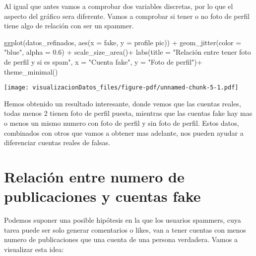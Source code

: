 \documentclass[
  letterpaper,
  DIV=11,
  numbers=noendperiod]{scrreprt}
\newenvironment{Shaded}{\begin{snugshade}}{\end{snugshade}}
\newcommand{\AttributeTok}[1]{\textcolor[rgb]{0.40,0.45,0.13}{#1}}
\newcommand{\FloatTok}[1]{\textcolor[rgb]{0.68,0.00,0.00}{#1}}
\newcommand{\FunctionTok}[1]{\textcolor[rgb]{0.28,0.35,0.67}{#1}}
\newcommand{\NormalTok}[1]{\textcolor[rgb]{0.00,0.23,0.31}{#1}}
\newcommand{\SpecialCharTok}[1]{\textcolor[rgb]{0.37,0.37,0.37}{#1}}
\newcommand{\StringTok}[1]{\textcolor[rgb]{0.13,0.47,0.30}{#1}}
\begin{document}
Al igual que antes vamos a comprobar dos variables discretas, por lo que
el aspecto del gráfico sera diferente. Vamos a comprobar si tener o no
foto de perfil tiene algo de relación con ser un spammer.

\begin{Shaded}
\begin{Highlighting}[]
\FunctionTok{ggplot}\NormalTok{(datos\_refinados, }\FunctionTok{aes}\NormalTok{(}\AttributeTok{x =} \StringTok{\textasciigrave{}}\AttributeTok{fake}\StringTok{\textasciigrave{}}\NormalTok{, }\AttributeTok{y =} \StringTok{\textasciigrave{}}\AttributeTok{profile pic}\StringTok{\textasciigrave{}}\NormalTok{)) }\SpecialCharTok{+}   
  \FunctionTok{geom\_jitter}\NormalTok{(}\AttributeTok{color =} \StringTok{"blue"}\NormalTok{, }\AttributeTok{alpha =} \FloatTok{0.6}\NormalTok{) }\SpecialCharTok{+}   
  \FunctionTok{scale\_size\_area}\NormalTok{()}\SpecialCharTok{+}   
  \FunctionTok{labs}\NormalTok{(}\AttributeTok{title =} \StringTok{"Relación entre tener foto de perfil y si es spam"}\NormalTok{,        }
       \AttributeTok{x =} \StringTok{"Cuenta fake"}\NormalTok{,        }
       \AttributeTok{y =} \StringTok{"Foto de perfil"}\NormalTok{)}\SpecialCharTok{+}   
  \FunctionTok{theme\_minimal}\NormalTok{() }
\end{Highlighting}
\end{Shaded}

\texttt{[image: visualizacionDatos\_files/figure-pdf/unnamed-chunk-5-1.pdf]}

Hemos obtenido un resultado interesante, donde vemos que las cuentas
reales, todas menos 2 tienen foto de perfil puesta, mientras que las
cuentas fake hay mas o menos un mismo numero con foto de perfil y sin
foto de perfil. Estos datos, combinados con otros que vamos a obtener
mas adelante, nos pueden ayudar a diferenciar cuentas reales de falsas.

\section{Relación entre numero de publicaciones y cuentas
fake}\label{relaciuxf3n-entre-numero-de-publicaciones-y-cuentas-fake}

Podemos suponer una posible hipótesis en la que los usuarios spammers,
cuya tarea puede ser solo generar comentarios o likes, van a tener
cuentas con menos numero de publicaciones que una cuenta de una persona
verdadera. Vamos a visualizar esta idea:
\end{document}
